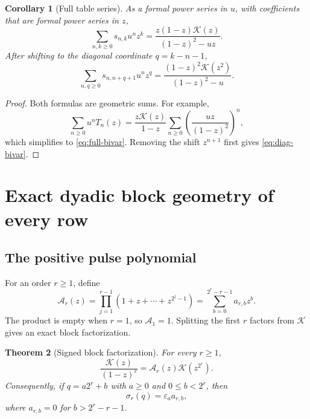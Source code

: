 \documentclass[11pt]{article}
\newtheorem{theorem}{Theorem}[section]
\newtheorem{corollary}[theorem]{Corollary}
\theoremstyle{definition}
\theoremstyle{remark}
\newcommand{\eps}{\varepsilon}
\newcommand{\K}{\mathcal K}
\newcommand{\A}{\mathcal A}
\begin{document}
\begin{corollary}[Full table series]
As a formal power series in \(u\), with coefficients that are formal power
series in \(z\),
\begin{equation}
 \sum_{n,k\geq0}s_{n,k}u^nz^k
 =\frac{z(1-z)\K(z)}{(1-z)^2-uz}.                          \label{eq:full-bivar}
\end{equation}
After shifting to the diagonal coordinate \(q=k-n-1\),
\begin{equation}
 \sum_{n,q\geq0}s_{n,n+q+1}u^nz^q
 =\frac{(1-z)^2\K(z^2)}{(1-z)^2-u}.                        \label{eq:diag-bivar}
\end{equation}
\end{corollary}

\begin{proof}
Both formulas are geometric sums.  For example,
\[
 \sum_{n\geq0}u^nT_n(z)
 =\frac{z\K(z)}{1-z}
   \sum_{n\geq0}\left(\frac{uz}{(1-z)^2}\right)^n,
\]
which simplifies to \cref{eq:full-bivar}.  Removing the shift
\(z^{n+1}\) first gives \cref{eq:diag-bivar}.
\end{proof}

\section{Exact dyadic block geometry of every row}

\subsection{The positive pulse polynomial}

For an order \(r\geq1\), define
\begin{equation}
 \A_r(z)=\prod_{j=1}^{r-1}(1+z+\cdots+z^{2^j-1})
        =\sum_{b=0}^{2^r-r-1}a_{r,b}z^b.                  \label{eq:A-def}
\end{equation}
The product is empty when \(r=1\), so \(\A_1=1\).  Splitting the first
\(r\) factors from \(\K\) gives an exact block factorization.

\begin{theorem}[Signed block factorization]
For every \(r\geq1\),
\begin{equation}
 \frac{\K(z)}{(1-z)^r}=\A_r(z)\K(z^{2^r}).                 \label{eq:block-factor}
\end{equation}
Consequently, if \(q=a2^r+b\) with \(a\geq0\) and
\(0\leq b<2^r\), then
\begin{equation}
 \boxed{\sigma_r(q)=\eps_a a_{r,b},}                      \label{eq:block-law}
\end{equation}
where \(a_{r,b}=0\) for \(b>2^r-r-1\).
\end{theorem}
\end{document}
